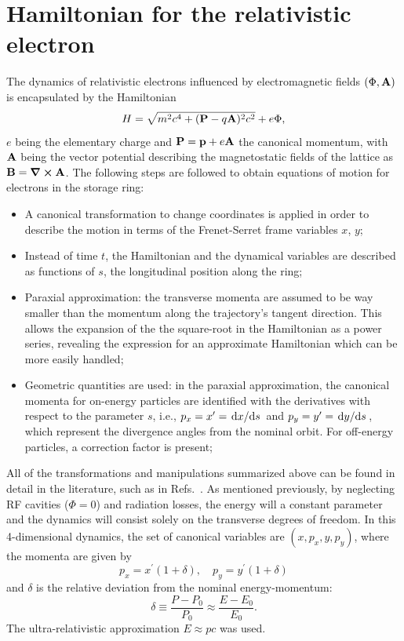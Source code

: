 \section{Hamiltonian for the relativistic electron}
The dynamics of relativistic electrons influenced by electromagnetic fields $(\Phi, \vb{A})$ is encapsulated by the Hamiltonian \cite{landau_classical_1975}
    \begin{equation*}
        H=\sqrt{m^2c^4+(\vb{P}-q\vb{A})^2c^2}+e\Phi,
    \end{equation*}
 $e$ being the elementary charge and $\vb{P}=\vb{p}+e\vb{A}$ the canonical momentum, with $\vb{A}$ being the vector potential describing the magnetostatic fields of the lattice as $\vb{B}=\curl \vb{A}$. The following steps are followed to obtain equations of motion for electrons in the storage ring:
 \begin{itemize}
    \item A canonical transformation to change coordinates is applied in order to describe the motion in terms of the Frenet-Serret frame variables $x$, $y$;
    \item Instead of time $t$, the Hamiltonian and the dynamical variables are described as functions of $s$, the longitudinal position along the ring;
    \item Paraxial approximation: the transverse momenta are assumed to be way smaller than the momentum along the trajectory's tangent direction. This allows the expansion of the the square-root in the Hamiltonian as a power series, revealing the expression for an approximate Hamiltonian which can be more easily handled;
    \item Geometric quantities are used: in the paraxial approximation, the canonical momenta for on-energy particles are identified with the derivatives with respect to the parameter $s$, i.e., $p_x = x^\prime = \dv*{x}{s}$ and $p_y = y^\prime = \dv*{y}{s}$, which represent the divergence angles from the nominal orbit. For off-energy particles, a correction factor is present;
 \end{itemize}
 All of the transformations and manipulations summarized above can be found in detail in the literature, such as in Refs.~\cite{lee_accelerator_2004, wiedemann_particle_2015,  wolski_beam_2014}. As mentioned previously, by neglecting RF cavities ($\Phi=0$) and radiation losses, the energy will a constant parameter and the dynamics will consist solely on the transverse degrees of freedom.  In this 4-dimensional dynamics, the set of canonical variables are $(x,p_{x},y , p_{y})$, where the momenta are given by
\begin{equation} p_{x}= x^\prime(1+\delta),\quad p_{y}=y^\prime (1+\delta)\end{equation}
and $\delta$ is the relative deviation from the nominal energy-momentum:
\begin{equation}
    \delta \equiv \frac{P-P_{0}}{P_{0}}\approx\frac{E-E_0}{E_0}.
\end{equation}
The ultra-relativistic approximation $E\approx pc$ was used.

